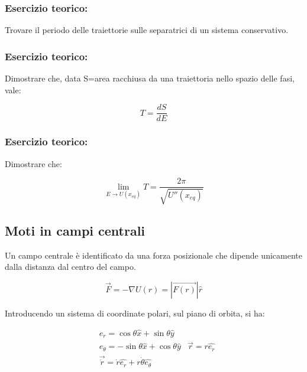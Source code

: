 \documentclass{article}
\begin{document}
\subsubsection*{Esercizio teorico:}

Trovare il periodo delle traiettorie sulle separatrici di un sistema conservativo.

\subsubsection*{Esercizio teorico:}

Dimostrare che, data S=area racchiusa da una traiettoria nello spazio delle fasi, vale:

\begin{equation}
    T=\frac{dS}{dE}
\end{equation}

\subsubsection*{Esercizio teorico:}

Dimostrare che:

\begin{equation}
    \lim_{E \rightarrow U(x_{eq})} T= \frac{2\pi}{ \sqrt{U''(x_{eq})}}
\end{equation}

\subsection{Moti in campi centrali}
Un campo centrale è identificato da una forza posizionale che dipende unicamente dalla distanza dal centro del campo.

\begin{equation}
    \vec{F}=-\nabla U(r)= |\vec{F(r)}|\hat{r}
\end{equation}

Introducendo un sistema di coordinate polari, sul piano di orbita, si ha:

\begin{equation}
    \begin{aligned}
         & e_r= \cos{\theta}\hat{x}+\sin{\theta}\hat{y}                \\
         & e_\theta= -\sin{\theta}\hat{x}+\cos{\theta}\hat{y}
         & \vec{r}= r\hat{e_r}                                         \\
         & \vec{\dot{r}}= \dot{r}\hat{e_r}+r\dot{\theta}\hat{e_\theta}
    \end{aligned}
\end{equation}
\end{document}
